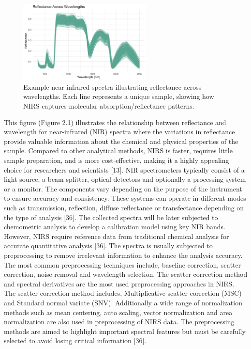 \documentclass[12pt,a4paper]{article}
\begin{document}
\begin{figure}[h]
    \centering
    \includegraphics[width=0.6\textwidth]{images/NIRS_spectra.png} 
    \caption{Example near-infrared spectra illustrating reflectance across wavelengths. Each line represents a unique sample, showing how NIRS captures molecular absorption/reflectance patterns.}
    \label{Figure 5}
\end{figure}

This figure (Figure 2.1)  illustrates the relationship between reflectance and wavelength for near-infrared (NIR) spectra where the variations in reflectance provide valuable information about the chemical and physical properties of the sample. Compared to other analytical methods, NIRS is faster, requires little sample preparation, and is more cost-effective, making it a highly appealing choice for researchers and scientists [13]. NIR spectrometers typically consist of a light source, 
a beam splitter, optical detectors and optionally a processing system or a  monitor. The components vary depending on the purpose of the instrument to ensure accuracy and consistency. These systems can operate in different modes such as transmission, reflection, diffuse reflectance or transfectance depending on the type of analysis [36]. The collected spectra will be later subjected to chemometric analysis to develop a calibration model using key NIR bands. However, NIRS require reference data from traditional chemical analysis for accurate quantitative analysis [36].
The spectra is usually subjected to preprocessing to remove irrelevant information to enhance the analysis accuracy. The most common preprocessing techniques include, baseline correction, scatter correction, noise removal and wavelength selection. The scatter correction method and spectral derivatives are the most used preprocessing approaches in NIRS. The scatter correction method includes, Multiplicative scatter correction (MSC) and Standard normal variate (SNV). Additionally a wide 
range of normalization methods such as mean centering, auto scaling, vector normalization and area normalization are also used in preprocessing of NIRS data. The preprocessing methods are aimed to highlight important spectral features but must be carefully selected to avoid losing critical information [36]. \\
\end{document}
